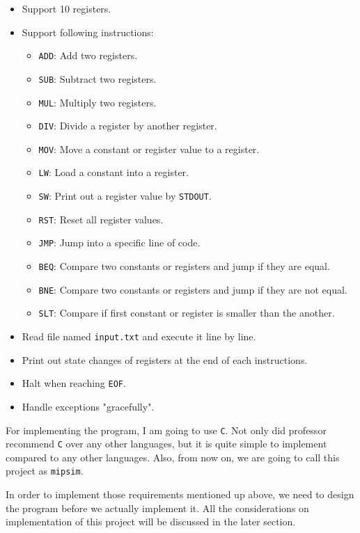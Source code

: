 \documentclass{homework}
\begin{document}
\begin{itemize}
    \item Support 10 registers.
    \item Support following instructions:
    \begin{itemize}
        \item \texttt{ADD}: Add two registers.
        \item \texttt{SUB}: Subtract two registers.
        \item \texttt{MUL}: Multiply two registers.
        \item \texttt{DIV}: Divide a register by another register.
        \item \texttt{MOV}: Move a constant or register value to a register.
        \item \texttt{LW}: Load a constant into a register.
        \item \texttt{SW}: Print out a register value by \texttt{STDOUT}.
        \item \texttt{RST}: Reset all register values.
        \item \texttt{JMP}: Jump into a specific line of code.
        \item \texttt{BEQ}: Compare two constants or registers and jump if they are equal.
        \item \texttt{BNE}: Compare two constants or registers and jump if they are not equal.
        \item \texttt{SLT}: Compare if first constant or register is smaller than the another.
    \end{itemize}
    \item Read file named \texttt{input.txt} and execute it line by line.
    \item Print out state changes of registers at the end of each instructions.
    \item Halt when reaching \texttt{EOF}.
    \item Handle exceptions "gracefully".
\end{itemize}

For implementing the program, I am going to use \texttt{C}. Not only did professor recommend \texttt{C} over any other languages, but it is quite simple to implement compared to any other languages. Also, from now on, we are going to call this project as \texttt{mipsim}. 

In order to implement those requirements mentioned up above, we need to design the program before we actually implement it. All the considerations on implementation of this project will be discussed in the later section.
\pagebreak
\end{document}
